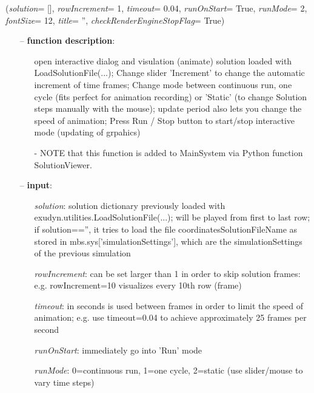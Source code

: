 \begin{flushleft}
\label{sec:mainsystemextensions:SolutionViewer}
({\it solution}= [], {\it rowIncrement}= 1, {\it timeout}= 0.04, {\it runOnStart}= True, {\it runMode}= 2, {\it fontSize}= 12, {\it title}= '', {\it checkRenderEngineStopFlag}= True)
\end{flushleft}
\setlength{\itemindent}{0.7cm}
\begin{itemize}[leftmargin=0.7cm]
\item[--]
{\bf function description}: \vspace{-6pt}
\begin{itemize}[leftmargin=1.2cm]
\setlength{\itemindent}{-0.7cm}
\item[]open interactive dialog and visulation (animate) solution loaded with LoadSolutionFile(...); Change slider 'Increment' to change the automatic increment of time frames; Change mode between continuous run, one cycle (fits perfect for animation recording) or 'Static' (to change Solution steps manually with the mouse); update period also lets you change the speed of animation; Press Run / Stop button to start/stop interactive mode (updating of grpahics)
\item[]- NOTE that this function is added to MainSystem via Python function SolutionViewer.
\end{itemize}
\item[--]
{\bf input}: \vspace{-6pt}
\begin{itemize}[leftmargin=1.2cm]
\setlength{\itemindent}{-0.7cm}
\item[]{\it solution}: solution dictionary previously loaded with exudyn.utilities.LoadSolutionFile(...); will be played from first to last row; if solution=='', it tries to load the file coordinatesSolutionFileName as stored in mbs.sys['simulationSettings'], which are the simulationSettings of the previous simulation
\item[]{\it rowIncrement}: can be set larger than 1 in order to skip solution frames: e.g. rowIncrement=10 visualizes every 10th row (frame)
\item[]{\it timeout}: in seconds is used between frames in order to limit the speed of animation; e.g. use timeout=0.04 to achieve approximately 25 frames per second
\item[]{\it runOnStart}: immediately go into 'Run' mode
\item[]{\it runMode}: 0=continuous run, 1=one cycle, 2=static (use slider/mouse to vary time steps)

\end{itemize}
\end{itemize}
